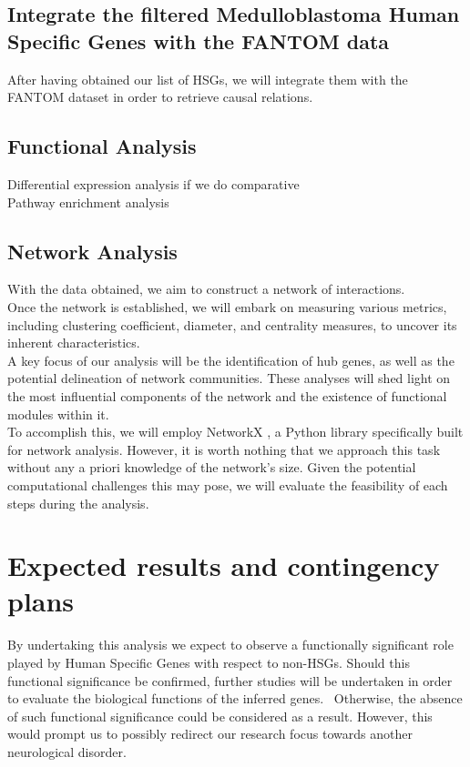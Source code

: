 \documentclass[10pt]{SelfArx} %
\begin{document}
\subsection{Integrate the filtered Medulloblastoma Human Specific Genes with the FANTOM data}
After having obtained our list of HSGs, we will integrate them with the FANTOM \cite{fantom5} dataset in order to retrieve causal relations.

\subsection{Functional Analysis}\label{sec:functional_analysis}
Differential expression analysis if we do comparative \\
Pathway enrichment analysis

\subsection{Network Analysis}\label{sec:network_analysis}
With the data obtained, we aim to construct a network of interactions. \\
Once the network is established, we will embark on measuring various metrics, including clustering coefficient, diameter, and centrality measures, to uncover its inherent characteristics. \\
A key focus of our analysis will be the identification of hub genes, as well as the potential delineation of network communities. These analyses will shed light on the most influential components of the network and the existence of functional modules within it. \\
To accomplish this, we will employ NetworkX \cite{hagberg2008exploring}, a Python library specifically built for network analysis. However, it is worth nothing that we approach this task without any a priori knowledge of the network's size. Given the potential computational challenges this may pose, we will evaluate the feasibility of each steps during the analysis. 

\section{Expected results and contingency plans}\label{sec:expected_results}
By undertaking this analysis we expect to observe a functionally significant role played by Human Specific Genes with respect to non-HSGs. Should this functional significance be confirmed, further studies will be undertaken in order to evaluate the biological functions of the inferred genes. \
Otherwise, the absence of such functional significance could be considered as a result. However, this would prompt us to possibly redirect our research focus towards another neurological disorder. 
\end{document}
